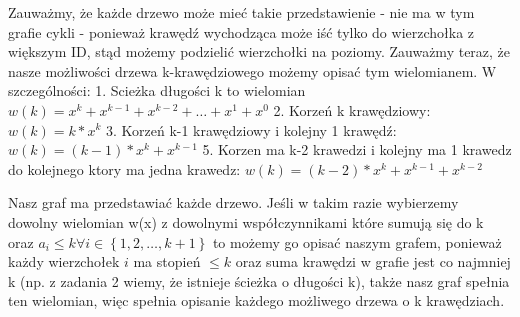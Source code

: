 \documentclass[12pt]{article}
\newcommand{\set}[1]{\left \{ #1 \right \}}				%
\begin{document}
Zauważmy, że każde drzewo może mieć takie przedstawienie - nie ma w tym grafie cykli - ponieważ krawędź wychodząca może iść tylko do wierzchołka z większym ID, stąd możemy podzielić wierzchołki na poziomy.
Zauważmy teraz, że nasze możliwości drzewa k-krawędziowego możemy opisać tym wielomianem. W szczególności:
1. Scieżka długości k to wielomian $w(k) = x^k + x^{k-1} + x^{k-2} + \dots + x^1 + x^0$
2. Korzeń k krawędziowy: $w(k) = k*x^k$
3. Korzeń k-1 krawędziowy i kolejny 1 krawędź: $w(k) = (k-1)*x^k + x^{k-1}$
5. Korzen ma k-2 krawedzi i kolejny ma 1 krawedz do kolejnego ktory ma jedna krawedz: $w(k) = (k-2)*x^k + x^{k-1} + x^{k-2}$

Nasz graf ma przedstawiać każde drzewo. Jeśli w takim razie wybierzemy dowolny wielomian w(x) z dowolnymi współczynnikami które sumują się do k oraz $a_i \leq k \forall i \in \set{1, 2, \dots, k+1}$ to możemy go opisać naszym grafem, ponieważ każdy wierzchołek $i$ ma stopień $\leq k$ oraz suma krawędzi w grafie jest co najmniej k (np. z zadania 2 wiemy, że istnieje ścieżka o długości k), także nasz graf spełnia ten wielomian, więc spełnia opisanie każdego możliwego drzewa o k krawędziach.



\egroup
\end{document}
